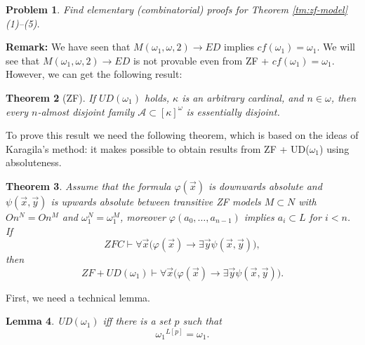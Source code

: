 \documentclass[a4paper,10pt,reqno]{amsart}
\numberwithin{equation}{section}
\newtheorem{theorem}{Theorem}[section]
\newtheorem{lemma}[theorem]{Lemma}
\newtheorem{problem}[theorem]{Problem}
\theoremstyle{definition}
\theoremstyle{remark}
\newcommand{\mc}[1]{\mathcal{#1}}
\newcommand{\subs}{\subset}
\begin{document}
\begin{problem}\label{cr:elementary}
    Find elementary (combinatorial) proofs for Theorem \ref{tm:zf-model}(1)--(5).
    \end{problem}
    

\noindent
{\bf Remark:} 
We have seen that $M({\omega}_1,{\omega},2)\to ED$ implies $cf({\omega}_1)={\omega}_1$.
We will see that 
$M({\omega}_1,{\omega},2)\to ED$ is not provable even from  ZF + $cf({\omega}_1)={\omega}_1$. 
However, we can get the following result: 




\begin{theorem}[ZF]\label{tm:ud2ed-gen}
If $UD({\omega}_1)$ holds, ${\kappa}$ is an arbitrary cardinal, and $n\in {\omega}$,
then every $n$-almost disjoint family $\mc A\subs {[{\kappa}]}^{{\omega}}$ is essentially 
disjoint.  
\end{theorem}


To prove this result  we need  the following 
 theorem,  which is based on the ideas of Karagila's method: it makes possible to
obtain results from ZF + UD(${\omega}_1$) using absoluteness.  


\begin{theorem}\label{tm:inner-oo}
    Assume that the formula ${\varphi}(\vec x)$ is downwards absolute  and $\psi(\vec x,\vec y)$ 
    is upwards absolute 
        between transitive ZF models $M\subs N$ with $On^N=On^M$ and ${\omega}_1^N={\omega}_1^M$,
        moreover 
    ${\varphi}(a_0,\dots, a_{n-1})$ implies  $a_i\subs L$ for $i<n$. 
    If 
    \begin{displaymath}
    ZFC \vdash \forall \vec x \big ( {\varphi}(\vec x) \to  \exists \vec y 
    \psi(\vec x,\vec y) \big ),
    \end{displaymath}
    then 
    \begin{displaymath}
        ZF + UD(\omega_1)%
        \vdash \forall \vec x  \big ( {\varphi}(\vec  x) \to 
        \exists \vec y \psi(\vec  x,\vec y) \big ).
        \end{displaymath}
        \end{theorem}
    First, we need a technical lemma. 
        \begin{lemma}\label{lm:un-eq}
            UD$({\omega}_1)$ %
            iff 
            there is a set $p$ such that 
            \begin{displaymath}
            {{\omega}_1}^{L[p]}={\omega}_1.
            \end{displaymath}
            \end{lemma}
            
\end{document}
